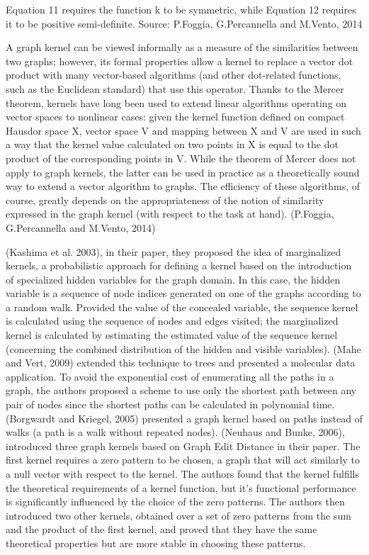 Equation 11 requires the function k to be symmetric, while Equation 12 requires it to be positive semi-definite. Source: P.Foggia, G.Percannella and M.Vento, 2014

A graph kernel can be viewed informally as a measure of the similarities between two graphs; however, its formal properties allow a kernel to replace a vector dot product with many vector-based algorithms (and other dot-related functions, such as the Euclidean standard) that use this operator. Thanks to the Mercer theorem, kernels have long been used to extend linear algorithms operating on vector spaces to nonlinear cases: given the kernel function defined on compact Hausdor space X, vector space V and mapping between X and V are used in such a way that the kernel value calculated on two points in X is equal to the dot product of the corresponding points in V. While the theorem of Mercer does not apply to graph kernels, the latter can be used in practice as a theoretically sound way to extend a vector algorithm to graphs. The efficiency of these algorithms, of course, greatly depends on the appropriateness of the notion of similarity expressed in the graph kernel (with respect to the task at hand). (P.Foggia, G.Percannella and M.Vento, 2014)

(Kashima et al. 2003), in their paper, they proposed the idea of marginalized kernels, a probabilistic approach for defining a kernel based on the introduction of specialized hidden variables for the graph domain. In this case, the hidden variable is a sequence of node indices generated on one of the graphs according to a random walk. Provided the value of the concealed variable, the sequence kernel is calculated using the sequence of nodes and edges visited; the marginalized kernel is calculated by estimating the estimated value of the sequence kernel (concerning the combined distribution of the hidden and visible variables). (Mahe and Vert, 2009) extended this technique to trees and presented a molecular data application. To avoid the exponential cost of enumerating all the paths in a graph, the authors proposed a scheme to use only the shortest path between any pair of nodes since the shortest paths can be calculated in polynomial time. (Borgwardt and Kriegel, 2005) presented a graph kernel based on paths instead of walks (a path is a walk without repeated nodes). (Neuhaus and Bunke, 2006), introduced three graph kernels based on Graph Edit Distance in their paper. The first kernel requires a zero pattern to be chosen, a graph that will act similarly to a null vector with respect to the kernel. The authors found that the kernel fulfills the theoretical requirements of a kernel function, but it's functional performance is significantly influenced by the choice of the zero patterns. The authors then introduced two other kernels, obtained over a set of zero patterns from the sum and the product of the first kernel, and proved that they have the same theoretical properties but are more stable in choosing these patterns.

